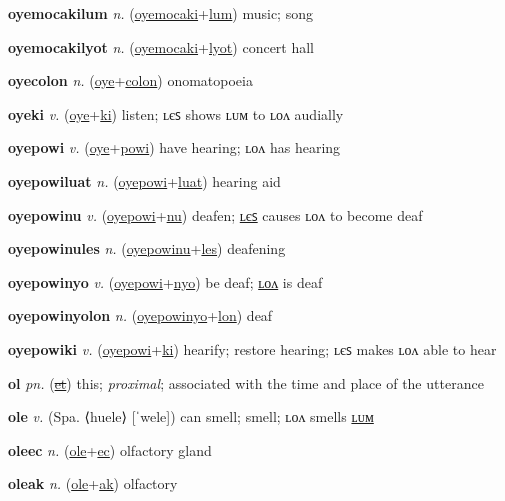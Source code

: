 \textbf{\hypertarget{oyemocakilum}{oyemocakilum}} \textit{n.} (\hyperlink{oyemocaki}{oyemocaki}+\allowbreak \hyperlink{lum}{lum})
music; song

\textbf{\hypertarget{oyemocakilyot}{oyemocakilyot}} \textit{n.} (\hyperlink{oyemocaki}{oyemocaki}+\allowbreak \hyperlink{lyot}{lyot})
concert hall

\textbf{\hypertarget{oyecolon}{oyecolon}} \textit{n.} (\hyperlink{oye}{oye}+\allowbreak \hyperlink{colon}{colon})
onomatopoeia

\textbf{\hypertarget{oyeki}{oyeki}} \textit{v.} (\hyperlink{oye}{oye}+\allowbreak \hyperlink{ki}{ki})
listen; ʟєꜱ shows ʟᴜᴍ to ʟᴏᴧ audially

\textbf{\hypertarget{oyepowi}{oyepowi}} \textit{v.} (\hyperlink{oye}{oye}+\allowbreak \hyperlink{powi}{powi})
have hearing; ʟᴏᴧ has hearing

\textbf{\hypertarget{oyepowiluat}{oyepowiluat}} \textit{n.} (\hyperlink{oyepowi}{oyepowi}+\allowbreak \hyperlink{luat}{luat})
hearing aid

\textbf{\hypertarget{oyepowinu}{oyepowinu}} \textit{v.} (\hyperlink{oyepowi}{oyepowi}+\allowbreak \hyperlink{nu}{nu})
deafen; \hyperlink{oyepowinules}{ʟєꜱ} causes ʟᴏᴧ to become deaf

\textbf{\hypertarget{oyepowinules}{oyepowinules}} \textit{n.} (\hyperlink{oyepowinu}{oyepowinu}+\allowbreak \hyperlink{les}{les})
deafening

\textbf{\hypertarget{oyepowinyo}{oyepowinyo}} \textit{v.} (\hyperlink{oyepowi}{oyepowi}+\allowbreak \hyperlink{nyo}{nyo})
be deaf; \hyperlink{oyepowinyolon}{ʟᴏᴧ} is deaf

\textbf{\hypertarget{oyepowinyolon}{oyepowinyolon}} \textit{n.} (\hyperlink{oyepowinyo}{oyepowinyo}+\allowbreak \hyperlink{lon}{lon})
deaf

\textbf{\hypertarget{oyepowiki}{oyepowiki}} \textit{v.} (\hyperlink{oyepowi}{oyepowi}+\allowbreak \hyperlink{ki}{ki})
hearify; restore hearing; ʟєꜱ makes ʟᴏᴧ able to hear

\textbf{\hypertarget{ol}{ol}} \textit{pn.} (\hyperlink{et}{\sout{et}})
this; \textit{proximal}; associated with the time and place of the utterance

\textbf{\hypertarget{ole}{ole}} \textit{v.} (Spa. ⟨huele⟩ [ˈwele])
can smell; smell; ʟᴏᴧ smells \hyperlink{olelum}{ʟᴜᴍ}

\textbf{\hypertarget{oleec}{oleec}} \textit{n.} (\hyperlink{ole}{ole}+\allowbreak \hyperlink{ec}{ec})
olfactory gland

\textbf{\hypertarget{oleak}{oleak}} \textit{n.} (\hyperlink{ole}{ole}+\allowbreak \hyperlink{ak}{ak})
olfactory

